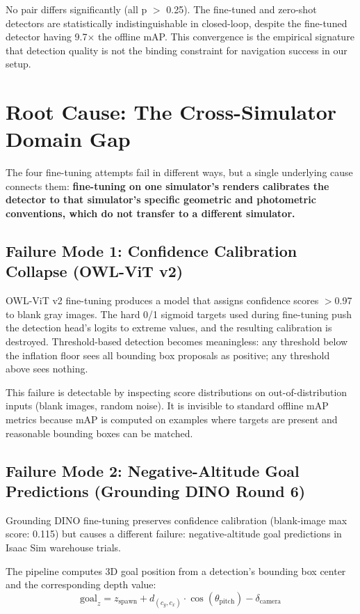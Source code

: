 \documentclass{article}
\begin{document}
No pair differs significantly (all p $>$ 0.25). The fine-tuned and zero-shot detectors are statistically indistinguishable in closed-loop, despite the fine-tuned detector having 9.7$\times$ the offline mAP. This convergence is the empirical signature that detection quality is not the binding constraint for navigation success in our setup.

\section{Root Cause: The Cross-Simulator Domain Gap}

The four fine-tuning attempts fail in different ways, but a single underlying cause connects them: \textbf{fine-tuning on one simulator's renders calibrates the detector to that simulator's specific geometric and photometric conventions, which do not transfer to a different simulator.}

\subsection{Failure Mode 1: Confidence Calibration Collapse (OWL-ViT v2)}

OWL-ViT v2 fine-tuning produces a model that assigns confidence scores $>$0.97 to blank gray images. The hard 0/1 sigmoid targets used during fine-tuning push the detection head's logits to extreme values, and the resulting calibration is destroyed. Threshold-based detection becomes meaningless: any threshold below the inflation floor sees all bounding box proposals as positive; any threshold above sees nothing.

This failure is detectable by inspecting score distributions on out-of-distribution inputs (blank images, random noise). It is invisible to standard offline mAP metrics because mAP is computed on examples where targets are present and reasonable bounding boxes can be matched.

\subsection{Failure Mode 2: Negative-Altitude Goal Predictions (Grounding DINO Round 6)}

Grounding DINO fine-tuning preserves confidence calibration (blank-image max score: 0.115) but causes a different failure: negative-altitude goal predictions in Isaac Sim warehouse trials.

The pipeline computes 3D goal position from a detection's bounding box center and the corresponding depth value:
\begin{equation}
\text{goal}_z = z_{\text{spawn}} + d_{(c_y, c_x)} \cdot \cos(\theta_{\text{pitch}}) - \delta_{\text{camera}}
\end{equation}
\end{document}
